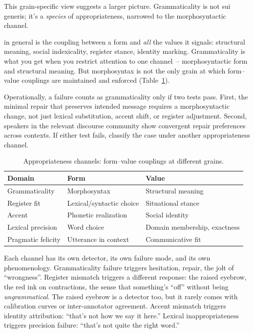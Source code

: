 This grain-specific view suggests a larger picture. Grammaticality is not sui generis; it's a \emph{species} of appropriateness, narrowed to the morphosyntactic channel.

 in general is the coupling between a form and \emph{all} the values it signals: structural meaning, social indexicality, register stance, identity marking. Grammaticality is what you get when you restrict attention to one channel~-- morphosyntactic form and structural meaning. But morphosyntax is not the only grain at which form--value couplings are maintained and enforced (Table~\ref{tab:appropriateness-channels}).

Operationally, a failure counts as grammaticality only if two tests pass. First, the minimal repair that preserves intended message requires a morphosyntactic change, not just lexical substitution, accent shift, or register adjustment. Second, speakers in the relevant discourse community show convergent repair preferences across contexts. If either test fails, classify the case under another appropriateness channel.

\begin{table}[h]
\centering
\small
\begin{tabular}{@{}lll@{}}
\toprule
\textbf{Domain} & \textbf{Form} & \textbf{Value} \\
\midrule
Grammaticality & Morphosyntax & Structural meaning \\
Register fit & Lexical/syntactic choice & Situational stance \\
Accent & Phonetic realization & Social identity \\
Lexical precision & Word choice & Domain membership, exactness \\
Pragmatic felicity & Utterance in context & Communicative fit \\
\bottomrule
\end{tabular}
\caption{Appropriateness channels: form--value couplings at different grains.}
\label{tab:appropriateness-channels}
\end{table}

Each channel has its own detector, its own failure mode, and its own phenomenology. Grammaticality failure triggers hesitation, repair, the jolt of \enquote{wrongness}. Register mismatch triggers a different response: the raised eyebrow, the red ink on contractions, the sense that something's \enquote{off} without being \emph{ungrammatical}. The raised eyebrow is a detector too, but it rarely comes with calibration curves or inter-annotator agreement. Accent mismatch triggers identity attribution: \enquote{that's not how we say it here.} Lexical inappropriateness triggers precision failure: \enquote{that's not quite the right word.}

